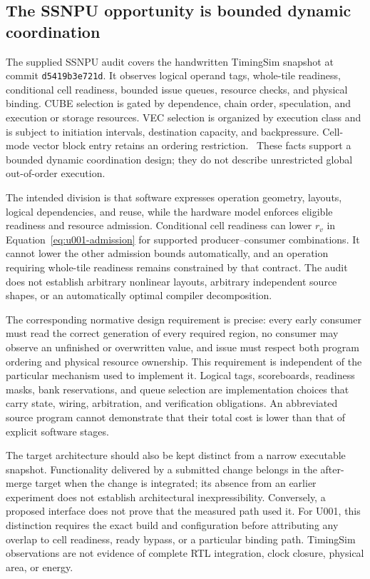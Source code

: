 \subsection{The SSNPU opportunity is bounded dynamic coordination}

The supplied SSNPU audit covers the handwritten TimingSim snapshot at commit \texttt{d5419b3e721d}. It observes logical operand tags, whole-tile readiness, conditional cell readiness, bounded issue queues, resource checks, and physical binding. CUBE selection is gated by dependence, chain order, speculation, and execution or storage resources. VEC selection is organized by execution class and is subject to initiation intervals, destination capacity, and backpressure. Cell-mode vector block entry retains an ordering restriction.~\citep{u001-ssnpu-audit} These facts support a bounded dynamic coordination design; they do not describe unrestricted global out-of-order execution.

The intended division is that software expresses operation geometry, layouts, logical dependencies, and reuse, while the hardware model enforces eligible readiness and resource admission. Conditional cell readiness can lower $r_v$ in Equation~\ref{eq:u001-admission} for supported producer--consumer combinations. It cannot lower the other admission bounds automatically, and an operation requiring whole-tile readiness remains constrained by that contract. The audit does not establish arbitrary nonlinear layouts, arbitrary independent source shapes, or an automatically optimal compiler decomposition.

The corresponding normative design requirement is precise: every early consumer must read the correct generation of every required region, no consumer may observe an unfinished or overwritten value, and issue must respect both program ordering and physical resource ownership. This requirement is independent of the particular mechanism used to implement it. Logical tags, scoreboards, readiness masks, bank reservations, and queue selection are implementation choices that carry state, wiring, arbitration, and verification obligations. An abbreviated source program cannot demonstrate that their total cost is lower than that of explicit software stages.

The target architecture should also be kept distinct from a narrow executable snapshot. Functionality delivered by a submitted change belongs in the after-merge target when the change is integrated; its absence from an earlier experiment does not establish architectural inexpressibility. Conversely, a proposed interface does not prove that the measured path used it. For U001, this distinction requires the exact build and configuration before attributing any overlap to cell readiness, ready bypass, or a particular binding path. TimingSim observations are not evidence of complete RTL integration, clock closure, physical area, or energy.

